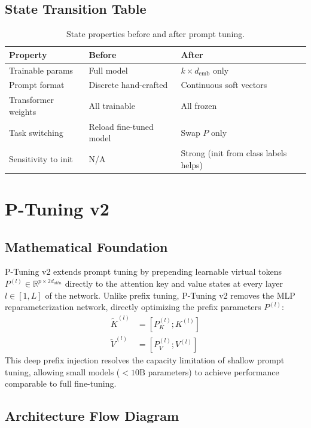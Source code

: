 \documentclass{article}
\begin{document}
\subsection{State Transition Table}
\begin{table}[h]\centering
\begin{tabular}{lll}\toprule
\textbf{Property} & \textbf{Before} & \textbf{After}\\\midrule
Trainable params & Full model & $k \times d_{\text{emb}}$ only\\
Prompt format & Discrete hand-crafted & Continuous soft vectors\\
Transformer weights & All trainable & All frozen\\
Task switching & Reload fine-tuned model & Swap $P$ only\\
Sensitivity to init & N/A & Strong (init from class labels helps)\\\bottomrule
\end{tabular}
\caption{State properties before and after prompt tuning.}
\end{table}

\newpage
\section{P-Tuning v2}

\subsection{Mathematical Foundation}
P-Tuning v2 extends prompt tuning by prepending learnable virtual tokens $P^{(l)} \in \mathbb{R}^{p \times 2 d_{attn}}$ directly to the attention key and value states at every layer $l \in [1, L]$ of the network. Unlike prefix tuning, P-Tuning v2 removes the MLP reparameterization network, directly optimizing the prefix parameters $P^{(l)}$:
\begin{align}
  \tilde{K}^{(l)} &= [P^{(l)}_K ; K^{(l)}] \\
  \tilde{V}^{(l)} &= [P^{(l)}_V ; V^{(l)}]
\end{align}
This deep prefix injection resolves the capacity limitation of shallow prompt tuning, allowing small models ($<10\text{B}$ parameters) to achieve performance comparable to full fine-tuning.

\subsection{Architecture Flow Diagram}
\end{document}

